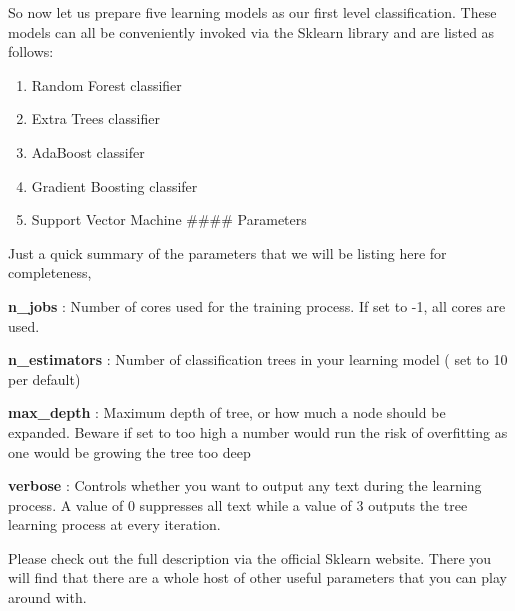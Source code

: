 \documentclass[11pt]{article}
\providecommand{\tightlist}{%
      \setlength{\itemsep}{0pt}\setlength{\parskip}{0pt}}
\begin{document}
So now let us prepare five learning models as our first level
classification. These models can all be conveniently invoked via the
Sklearn library and are listed as follows:

\begin{enumerate}
\def\labelenumi{\arabic{enumi}.}
\tightlist
\item
  Random Forest classifier\\
\item
  Extra Trees classifier\\
\item
  AdaBoost classifer
\item
  Gradient Boosting classifer
\item
  Support Vector Machine \#\#\#\# Parameters
\end{enumerate}

Just a quick summary of the parameters that we will be listing here for
completeness,

\textbf{n\_jobs} : Number of cores used for the training process. If set
to -1, all cores are used.

\textbf{n\_estimators} : Number of classification trees in your learning
model ( set to 10 per default)

\textbf{max\_depth} : Maximum depth of tree, or how much a node should
be expanded. Beware if set to too high a number would run the risk of
overfitting as one would be growing the tree too deep

\textbf{verbose} : Controls whether you want to output any text during
the learning process. A value of 0 suppresses all text while a value of
3 outputs the tree learning process at every iteration.

Please check out the full description via the official Sklearn website.
There you will find that there are a whole host of other useful
parameters that you can play around with.
\end{document}
